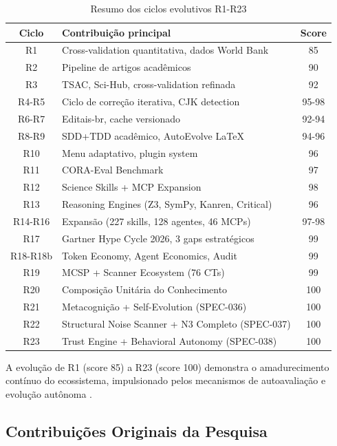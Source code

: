 \begin{table}[htb]
\centering
\caption{Resumo dos ciclos evolutivos R1-R23}
\label{tab:ciclos-resumo}
\begin{tabular}{clc}
\toprule
\textbf{Ciclo} & \textbf{Contribuição principal} & \textbf{Score} \\
\midrule
R1 & Cross-validation quantitativa, dados World Bank & 85 \\
R2 & Pipeline de artigos acadêmicos & 90 \\
R3 & TSAC, Sci-Hub, cross-validation refinada & 92 \\
R4-R5 & Ciclo de correção iterativa, CJK detection & 95-98 \\
R6-R7 & Editais-br, cache versionado & 92-94 \\
R8-R9 & SDD+TDD acadêmico, AutoEvolve LaTeX & 94-96 \\
R10 & Menu adaptativo, plugin system & 96 \\
R11 & CORA-Eval Benchmark & 97 \\
R12 & Science Skills + MCP Expansion & 98 \\
R13 & Reasoning Engines (Z3, SymPy, Kanren, Critical) & 96 \\
R14-R16 & Expansão (227 skills, 128 agentes, 46 MCPs) & 97-98 \\
R17 & Gartner Hype Cycle 2026, 3 gaps estratégicos & 99 \\
R18-R18b & Token Economy, Agent Economics, Audit & 99 \\
R19 & MCSP + Scanner Ecosystem (76 CTs) & 99 \\
R20 & Composição Unitária do Conhecimento & 100 \\
R21 & Metacognição + Self-Evolution (SPEC-036) & 100 \\
R22 & Structural Noise Scanner + N3 Completo (SPEC-037) & 100 \\
R23 & Trust Engine + Behavioral Autonomy (SPEC-038) & 100 \\
\bottomrule
\end{tabular}
\end{table}

A evolução de R1 (score 85) a R23 (score 100) demonstra o amadurecimento
contínuo do ecossistema, impulsionado pelos mecanismos de autoavaliação e
evolução autônoma \cite{opencode2026ecosystem}.

\subsection{Contribuições Originais da Pesquisa}

